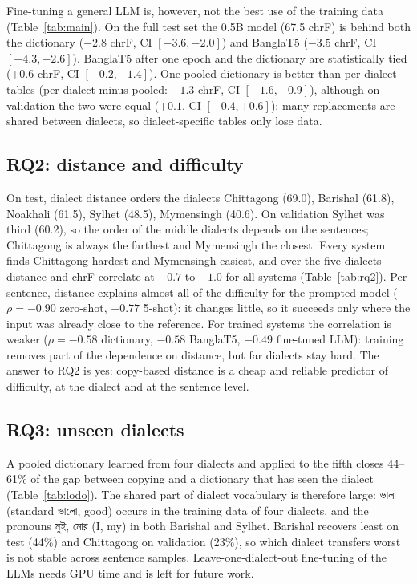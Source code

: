 \documentclass[10pt,twocolumn]{article}
\newcommand{\bn}[1]{\textbengali{#1}}
\begin{document}
Fine-tuning a general LLM is, however, not the best use of the training data (Table~\ref{tab:main}). On the
full test set the 0.5B model (67.5 chrF) is behind both the dictionary ($-2.8$ chrF, CI $[-3.6, -2.0]$) and BanglaT5
($-3.5$ chrF, CI $[-4.3, -2.6]$). BanglaT5 after one epoch and the dictionary are statistically tied ($+0.6$ chrF, CI $[-0.2, +1.4]$). One pooled
dictionary is better than per-dialect tables (per-dialect minus pooled: $-1.3$ chrF, CI $[-1.6, -0.9]$), although on
validation the two were equal ($+0.1$, CI $[-0.4, +0.6]$): many replacements are shared between dialects, so
dialect-specific tables only lose data.



\subsection{RQ2: distance and difficulty}
On test, dialect distance orders the dialects Chittagong (69.0), Barishal (61.8), Noakhali (61.5), Sylhet
(48.5), Mymensingh (40.6). On validation Sylhet was third (60.2), so the order of the middle dialects depends
on the sentences; Chittagong is always the farthest and Mymensingh the closest. Every system finds
Chittagong hardest and Mymensingh easiest, and over the five dialects distance and chrF correlate at
$-0.7$ to $-1.0$ for all systems (Table~\ref{tab:rq2}). Per sentence, distance explains almost all of the
difficulty for the prompted model ($\rho=-0.90$ zero-shot, $-0.77$ 5-shot): it changes little, so it
succeeds only where the input was already close to the reference. For trained systems the correlation is
weaker ($\rho=-0.58$ dictionary, $-0.58$ BanglaT5, $-0.49$ fine-tuned LLM): training removes part
of the dependence on distance, but far dialects stay hard. The answer to RQ2 is yes: copy-based distance is a
cheap and reliable predictor of difficulty, at the dialect and at the sentence level.



\subsection{RQ3: unseen dialects}
A pooled dictionary learned from four dialects and applied to the fifth closes 44--61\% of the gap between
copying and a dictionary that has seen the dialect (Table~\ref{tab:lodo}). The shared part of dialect
vocabulary is therefore large: \bn{ভালা} (standard \bn{ভালো}, good) occurs in the training data of four
dialects, and the pronouns \bn{মুই}, \bn{মোর} (I, my) in both Barishal and Sylhet. Barishal recovers least on
test (44\%) and Chittagong on validation (23\%), so which dialect transfers worst is not stable across
sentence samples. Leave-one-dialect-out fine-tuning of the
LLMs needs GPU time and is left for future work.
\end{document}
